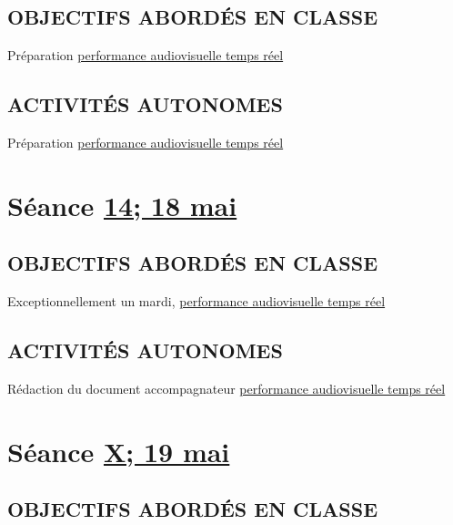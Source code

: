 \documentclass[
  french,
]{book}
\begin{document}
\hypertarget{objectifs-aborduxe9s-en-classe-14}{%
\subsection{OBJECTIFS ABORDÉS EN CLASSE}\label{objectifs-aborduxe9s-en-classe-14}}

Préparation \protect\hyperlink{sommatif_5}{performance audiovisuelle temps réel}

\hypertarget{activituxe9s-autonomes-14}{%
\subsection{ACTIVITÉS AUTONOMES}\label{activituxe9s-autonomes-14}}

Préparation \protect\hyperlink{sommatif_5}{performance audiovisuelle temps réel}

\hypertarget{semaine_16}{%
\section{\texorpdfstring{Séance \protect\hyperlink{semaine_16}{14; 18 mai}}{Séance 14; 18 mai}}\label{semaine_16}}

\hypertarget{objectifs-aborduxe9s-en-classe-15}{%
\subsection{OBJECTIFS ABORDÉS EN CLASSE}\label{objectifs-aborduxe9s-en-classe-15}}

Exceptionnellement un mardi,
\protect\hyperlink{sommatif_5}{performance audiovisuelle temps réel}

\hypertarget{activituxe9s-autonomes-15}{%
\subsection{ACTIVITÉS AUTONOMES}\label{activituxe9s-autonomes-15}}

Rédaction du document accompagnateur \protect\hyperlink{sommatif_5}{performance audiovisuelle temps réel}

\hypertarget{semaine_17}{%
\section{\texorpdfstring{Séance \protect\hyperlink{semaine_17}{X; 19 mai}}{Séance X; 19 mai}}\label{semaine_17}}

\hypertarget{objectifs-aborduxe9s-en-classe-16}{%
\subsection{OBJECTIFS ABORDÉS EN CLASSE}\label{objectifs-aborduxe9s-en-classe-16}}
\end{document}
